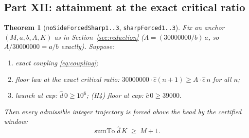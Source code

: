\documentclass[11pt]{article}
\newcommand{\dhat}{\widehat{d}}
\newcommand{\chat}{\widehat{c}}
\newcommand{\sumto}{\operatorname{sumTo}}
\theoremstyle{plain}
\newtheorem{theorem}[lemma]{Theorem}
\theoremstyle{definition}
\begin{document}
\subsection{Part XII: attainment at the exact critical ratio}\label{sec:squeeze}

\begin{theorem}[\texttt{noSideForcedSharp1..3}, \texttt{sharpForced1..3}]\label{thm:squeeze}
Fix an anchor $(M,a,b,A,K)$ as in Section~\ref{sec:reduction} ($A=(30000000/b)\,a$, so
$A/30000000=a/b$ exactly). Suppose:
\begin{enumerate}
\item[(H1)] exact coupling \eqref{eq:coupling};
\item[(H2)] floor law at the exact critical ratio: $30000000\cdot\chat(n+1)\ge A\cdot\chat\,n$ for all $n$;
\item[(H3)] launch at cap: $\dhat\,0\ge 10^{6}$; \quad (H4) floor at cap: $\chat\,0\ge 39000$.
\end{enumerate}
Then every admissible integer trajectory is forced above the head by the certified window:
\[
\sumto\dhat\,K\;\ge\;M+1 .
\]
\end{theorem}
\end{document}

